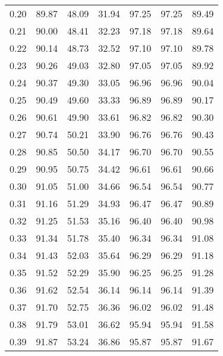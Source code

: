 \begin{tabular}{|c|c|c|c|c|c|c|}
      0.20 &     89.87 &     48.09 &      31.94 &   97.25 &      97.25 &         89.49 \\
      0.21 &     90.00 &     48.41 &      32.23 &   97.18 &      97.18 &         89.64 \\
      0.22 &     90.14 &     48.73 &      32.52 &   97.10 &      97.10 &         89.78 \\
      0.23 &     90.26 &     49.03 &      32.80 &   97.05 &      97.05 &         89.92 \\
      0.24 &     90.37 &     49.30 &      33.05 &   96.96 &      96.96 &         90.04 \\
      0.25 &     90.49 &     49.60 &      33.33 &   96.89 &      96.89 &         90.17 \\
      0.26 &     90.61 &     49.90 &      33.61 &   96.82 &      96.82 &         90.30 \\
      0.27 &     90.74 &     50.21 &      33.90 &   96.76 &      96.76 &         90.43 \\
      0.28 &     90.85 &     50.50 &      34.17 &   96.70 &      96.70 &         90.55 \\
      0.29 &     90.95 &     50.75 &      34.42 &   96.61 &      96.61 &         90.66 \\
      0.30 &     91.05 &     51.00 &      34.66 &   96.54 &      96.54 &         90.77 \\
      0.31 &     91.16 &     51.29 &      34.93 &   96.47 &      96.47 &         90.89 \\
      0.32 &     91.25 &     51.53 &      35.16 &   96.40 &      96.40 &         90.98 \\
      0.33 &     91.34 &     51.78 &      35.40 &   96.34 &      96.34 &         91.08 \\
      0.34 &     91.43 &     52.03 &      35.64 &   96.29 &      96.29 &         91.18 \\
      0.35 &     91.52 &     52.29 &      35.90 &   96.25 &      96.25 &         91.28 \\
      0.36 &     91.62 &     52.54 &      36.14 &   96.14 &      96.14 &         91.39 \\
      0.37 &     91.70 &     52.75 &      36.36 &   96.02 &      96.02 &         91.48 \\
      0.38 &     91.79 &     53.01 &      36.62 &   95.94 &      95.94 &         91.58 \\
      0.39 &     91.87 &     53.24 &      36.86 &   95.87 &      95.87 &         91.67 \\

\end{tabular}
